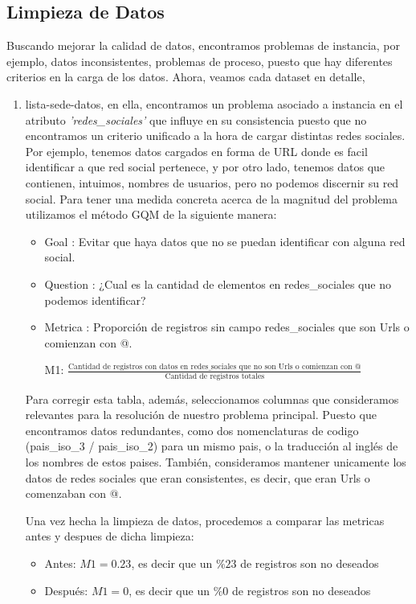 \documentclass[10pt,a4paper]{article}
\begin{document}
\subsection{Limpieza de Datos}

Buscando mejorar la calidad de datos, encontramos problemas de instancia, por ejemplo, datos inconsistentes, problemas de 
proceso, puesto que hay diferentes criterios en la carga de los datos. Ahora, veamos cada dataset en detalle,

\begin{enumerate}
	\item lista-sede-datos, en ella, encontramos un problema asociado a instancia en el atributo \textit{'redes\_sociales'} que influye en su consistencia puesto que no encontramos un criterio unificado a la hora de cargar distintas redes sociales. Por ejemplo, tenemos datos cargados en forma de URL donde es facil identificar a que red social pertenece, y por otro lado, tenemos datos que contienen, intuimos, nombres de usuarios, pero no podemos discernir su red social. Para tener una medida concreta acerca de la magnitud del problema utilizamos el método GQM de la siguiente manera:
\begin{itemize}
	\item Goal : Evitar que haya datos que no se puedan identificar con alguna red social.
	\item Question : ¿Cual es la cantidad de elementos en redes\_sociales que no podemos identificar?
	\item Metrica :  Proporción de registros sin campo redes\_sociales que son Urls o comienzan con @.
        
        \begin{center}          
        M1: $ \frac{\text{Cantidad de registros con datos en redes\_sociales que no son Urls o comienzan con @} }{\text{Cantidad de registros totales}} $
        \end{center}
    
\end{itemize}
Para corregir esta tabla, además, seleccionamos columnas que consideramos relevantes para la resolución de nuestro problema principal. Puesto que encontramos datos redundantes, como dos nomenclaturas de codigo (pais\_iso\_3 / pais\_iso\_2) para un mismo pais, o la traducción al inglés de los nombres de estos paises. También, consideramos mantener unicamente los datos de redes sociales que eran consistentes, es decir, que eran Urls o comenzaban con @.

Una vez hecha la limpieza de datos, procedemos a comparar las metricas antes y despues de dicha limpieza:
\begin{itemize}
    \item Antes: $M1 =  0.23$, es decir que un $\% 23$ de registros son no deseados
    \item Después: $M1 =  0$, es decir que un $\% 0$ de registros son no deseados
\end{itemize}


\end{enumerate}
\end{document}
